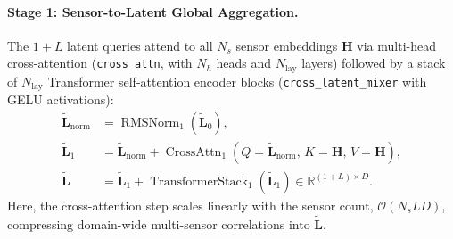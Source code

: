 \paragraph{Stage 1: Sensor-to-Latent Global Aggregation.}
The $1 + L$ latent queries attend to all $N_s$ sensor embeddings $\mathbf{H}$ via multi-head cross-attention (\texttt{cross\_attn}, with $N_h$ heads and $N_{\text{lay}}$ layers) followed by a stack of $N_{\text{lay}}$ Transformer self-attention encoder blocks (\texttt{cross\_latent\_mixer} with GELU activations):
\begin{align}
    \tilde{\mathbf{L}}_{\text{norm}} &= \operatorname{RMSNorm}_1(\tilde{\mathbf{L}}_0), \label{eq:bg_glu_enc_step1a} \\
    \tilde{\mathbf{L}}_1 &= \tilde{\mathbf{L}}_{\text{norm}} + \operatorname{CrossAttn}_1\!\left(Q = \tilde{\mathbf{L}}_{\text{norm}},\, K = \mathbf{H},\, V = \mathbf{H}\right), \label{eq:bg_glu_enc_step1b} \\
    \tilde{\mathbf{L}} &= \tilde{\mathbf{L}}_1 + \operatorname{TransformerStack}_1(\tilde{\mathbf{L}}_1) \in \mathbb{R}^{(1 + L) \times D}. \label{eq:bg_glu_enc_step1c}
\end{align}
Here, the cross-attention step scales linearly with the sensor count, $\mathcal{O}(N_s L D)$, compressing domain-wide multi-sensor correlations into $\tilde{\mathbf{L}}$.

